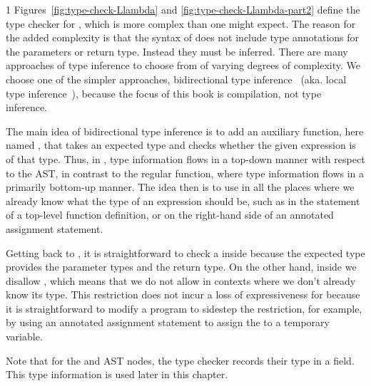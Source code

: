 \documentclass[7x10]{TimesAPriori_MIT}%
\def\pythonEd{1}
\def\edition{1}
\newcommand{\pythonColor}[0]{}
\numberwithin{theorem}{chapter}
\numberwithin{definition}{chapter}
\numberwithin{equation}{chapter}
\begin{document}
{\if\edition\pythonEd\pythonColor
%
Figures~\ref{fig:type-check-Llambda} and
\ref{fig:type-check-Llambda-part2} define the type checker for
\LangLam{}, which is more complex than one might expect. The reason
for the added complexity is that the syntax of  does not
include type annotations for the parameters or return type.  Instead
they must be inferred. There are many approaches of type inference to
choose from of varying degrees of complexity. We choose one of the
simpler approaches, bidirectional type inference~\citep{Dunfield:2021}
(aka. local type inference~\citep{Pierce:2000}), because the focus of
this book is compilation, not type inference.

The main idea of bidirectional type inference is to add an auxiliary
function, here named , that takes an expected type
and checks whether the given expression is of that type.  Thus, in
, type information flows in a top-down manner with
respect to the AST, in contrast to the regular 
function, where type information flows in a primarily bottom-up
manner.
%
The idea then is to use  in all the places where we
already know what the type of an expression should be, such as in the
 statement of a top-level function definition, or on the
right-hand side of an annotated assignment statement.

Getting back to , it is straightforward to check a
 inside  because the expected type
provides the parameter types and the return type.  On the other hand,
inside  we disallow , which means
that we do not allow  in contexts where we don't already
know its type. This restriction does not incur a loss of
expressiveness for \LangLam{} because it is straightforward to modify
a program to sidestep the restriction, for example, by using an
annotated assignment statement to assign the  to a
temporary variable.

Note that for the  and  AST nodes, the type
checker records their type in a  field. This type
information is used later in this chapter.
%
\fi}
\end{document}

